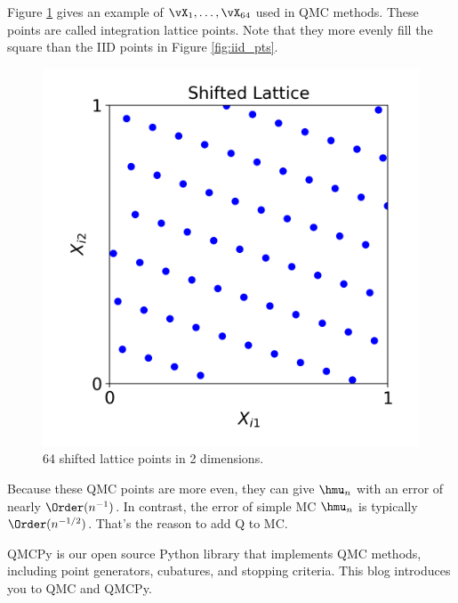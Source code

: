 Figure \ref{fig:lat_pts} gives an example of $\vX_1, \ldots, \vX_{64}$ used in QMC methods.  These points are called integration lattice points.  Note that they more evenly fill the square than the IID points in Figure \ref{fig:iid_pts}.

\begin{figure}[H]
    \centering
    \includegraphics[width=.6\textwidth]{WhyQ/lattice_pts.png}
    \caption{64 shifted lattice points in 2 dimensions.}
    \label{fig:lat_pts}
\end{figure}

Because these QMC points  are more even, they can give $\hmu_n$ with an error of nearly $\Order(n^{-1})$.  In contrast, the error of simple MC $\hmu_n$ is typically $\Order(n^{-1/2})$.  That's the reason to add Q to MC.

QMCPy \cite{QMCPy2020a} is our open source Python library that implements QMC methods, including point generators, cubatures, and stopping criteria.  This blog introduces you to QMC and QMCPy.